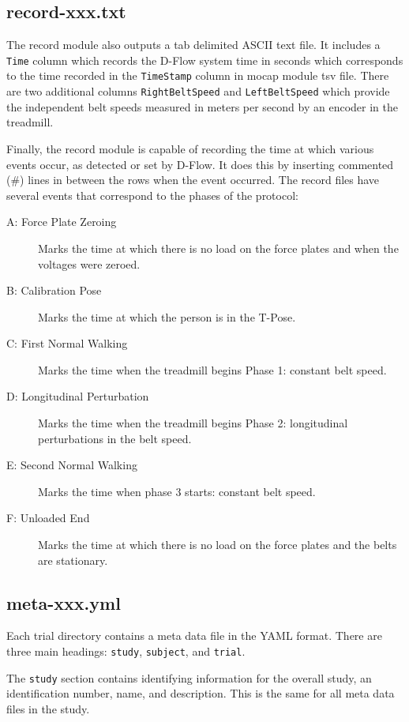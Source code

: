 \documentclass{article}
\begin{document}
\subsection{record-xxx.txt}
%
The record module also outputs a tab delimited ASCII text file. It includes a
\verb+Time+ column which records the D-Flow system time in seconds which
corresponds to the time recorded in the \verb+TimeStamp+ column in mocap module
tsv file. There are two additional columns \verb+RightBeltSpeed+ and
\verb+LeftBeltSpeed+ which provide the independent belt speeds measured in
meters per second by an encoder in the treadmill.

Finally, the record module is capable of recording the time at which various
events occur, as detected or set by D-Flow. It does this by inserting commented
(\#) lines in between the rows when the event occurred. The record files have
several events that correspond to the phases of the protocol:

\begin{description}
  \item[A: Force Plate Zeroing] Marks the time at which there is no load on the
    force plates and when the voltages were zeroed.
  \item[B: Calibration Pose] Marks the time at which the person is in the
    T-Pose.
  \item[C: First Normal Walking] Marks the time when the treadmill begins Phase
    1: constant belt speed.
  \item[D: Longitudinal Perturbation] Marks the time when the treadmill begins
    Phase 2: longitudinal perturbations in the belt speed.
  \item[E: Second Normal Walking] Marks the time when phase 3 starts: constant
    belt speed.
  \item[F: Unloaded End] Marks the time at which there is no load on the force
    plates and the belts are stationary.
\end{description}

\subsection{meta-xxx.yml}

Each trial directory contains a meta data file in the YAML format. There are
three main headings: \verb+study+, \verb+subject+, and \verb+trial+.

The \verb+study+ section contains identifying information for the overall
study, an identification number, name, and description. This is the same for
all meta data files in the study.
\end{document}
